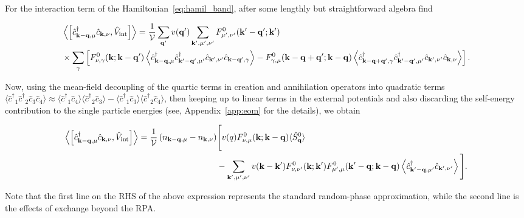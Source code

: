 \documentclass[aps, pra, reprint,superscriptaddress]{revtex4-1}
\def\be{\begin{equation}}
\def\ee{\end{equation}}
\def\kv{{\bf k}}
\def\qv{{\bf q}}
\def\Vc{{\cal V}}
\newcommand{\h}[1]{{\hat {#1}}}
\newcommand{\hdg}[1]{{\hat {#1}^\dagger}}
\begin{document}
For the interaction term of the Hamiltonian~\eqref{eq:hamil_band}, after some lengthly but straightforward algebra find
\begin{widetext}
\be\label{eq:cc-P1}
\begin{split}
&\left\langle\left[\hdg{c}_{\kv-\qv,\mu} \h{c}_{\kv,\nu},\hat{V}_{\rm int}\right]\right\rangle
=\frac{1}{\Vc} \sum_{\qv'}v(\qv')\sum_{\kv',\mu',\nu'}
F^{0}_{\mu',\nu'}(\kv'-\qv';\kv')\\
&\times\sum_\gamma\left[F^{0}_{\nu,\gamma}(\kv;\kv-\qv')
\left\langle\hdg{c}_{\kv-\qv,\mu} \hdg{c}_{\kv'-\qv',\mu'}\h{c}_{\kv',\nu'}\h{c}_{\kv-\qv',\gamma}\right\rangle
-F^{0}_{\gamma,\mu}(\kv-\qv+\qv';\kv-\qv)\left\langle\hdg{c}_{\kv-\qv+\qv',\gamma} \hdg{c}_{\kv'-\qv',\mu'}\h{c}_{\kv',\nu'}\h{c}_{\kv,\nu}\right\rangle\right].
\end{split}
\ee
\end{widetext}
Now, using the mean-field decoupling of the quartic terms in creation and annihilation operators into quadratic terms 
$
\langle\hdg{c}_1\hdg{c}_2\h{c}_3\h{c}_4 \rangle\approx  \langle \hdg{c}_1\h{c}_4\rangle  \langle\hdg{c}_2 \h{c}_3\rangle
- \langle \hdg{c}_1\h{c}_3\rangle \langle \hdg{c}_2 \h{c}_4\rangle
$,
then keeping up to linear terms in the external potentials and also discarding the self-energy contribution to the single particle energies (see, Appendix~\ref{app:eom} for the details), we obtain
\begin{widetext}
\be\label{eq:cc-P}
\begin{split}
\left \langle  \left[\hdg{c}_{\kv-\qv,\mu} \h{c}_{\kv,\nu},\hat{V}_{\rm int}\right]\right\rangle=
\frac{1}{\Vc}\left(n_{\kv-\qv,\mu}-n_{\kv,\nu}\right)  
&  \Bigg[
v(q) F^{0}_{\nu,\mu}(\kv;\kv-\qv)
\langle\h{S}^0_\qv \rangle    \\
&- \sum_{\kv',\mu',\nu'} v(\kv-\kv')
 F^{0}_{\nu,\nu'}(\kv;\kv') F^{0}_{\mu',\mu}(\kv'-\qv;\kv-\qv)\left\langle \hdg{c}_{\kv'-\qv,\mu'} \h{c}_{\kv',\nu'} \right\rangle\Bigg].
\end{split}
\ee
\end{widetext}
Note that the first line on the RHS of the above expression represents the standard random-phase approximation, while the second line is the effects of exchange beyond the RPA. 
\end{document}
